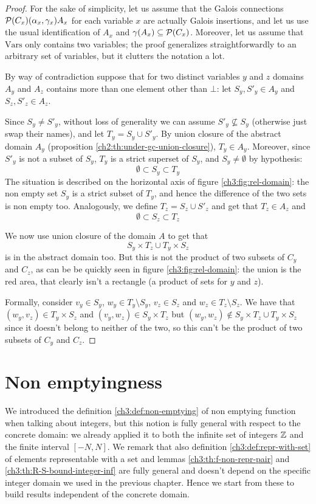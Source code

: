 \begin{proof}
	For the sake of simplicity, let us assume that the Galois connections $\mathcal{P}(C_x) (\alpha_x, \gamma_x) A_x$ for each variable $x$ are actually Galois insertions, and let us use the usual identification of $A_x$ and $\gamma(A_x) \subseteq \mathcal{P}(C_x)$.
	Moreover, let us assume that $\text{Vars}$ only contains two variables; the proof generalizes straightforwardly to an arbitrary set of variables, but it clutters the notation a lot.

	By way of contradiction suppose that for two distinct variables $y$ and $z$ domains $A_y$ and $A_z$ contains more than one element other than $\bot$: let $S_y, S'_y \in A_y$ and $S_z, S'_z \in A_z$.

	Since $S_y \neq S'_y$, without loss of generality we can assume $S'_y \nsubseteq S_y$ (otherwise just swap their names), and let $T_y = S_y \cup S'_y$. By union closure of the abstract domain $A_y$ (proposition \ref{ch2:th:under-gc-union-closure}), $T_y \in A_y$. Moreover, since $S'_y$ is not a subset of $S_y$, $T_y$ is a strict superset of $S_y$, and $S_y \neq \emptyset$ by hypothesis:
	\[
	\emptyset \subset S_y \subset T_y
	\]
	The situation is described on the horizontal axis of figure \ref{ch3:fig:rel-domain}: the non empty set $S_y$ is a strict subset of $T_y$, and hence the difference of the two sets is non empty too.
	Analogously, we define $T_z = S_z \cup S'_z$ and get that $T_z \in A_z$ and
	\[
	\emptyset \subset S_z \subset T_z
	\]

	We now use union closure of the domain $A$ to get that
	\[
	S_y \times T_z \cup T_y \times S_z
	\]
	is in the abstract domain too. But this is not the product of two subsets of $C_y$ and $C_z$, as can be be quickly seen in figure \ref{ch3:fig:rel-domain}: the union is the red area, that clearly isn't a rectangle (a product of sets for $y$ and $z$).
	
	Formally, consider $v_y \in S_y$, $w_y \in T_y \setminus S_y$, $v_z \in S_z$ and $w_z \in T_z \setminus S_z$. We have that $(w_y, v_z) \in T_y \times S_z$ and $(v_y, w_z) \in S_y \times T_z$ but $(w_y, w_z) \notin S_y \times T_z \cup T_y \times S_z$ since it doesn't belong to neither of the two, so this can't be the product of two subsets of $C_y$ and $C_z$.
\end{proof}

\section{Non emptyingness}
We introduced the definition \ref{ch3:def:non-emptying} of non emptying function when talking about integers, but this notion is fully general with respect to the concrete domain: we already applied it to both the infinite set of integers $\mathbb{Z}$ and the finite interval $[-N, N]$.
We remark that also definition \ref{ch3:def:repr-with-set} of elements representable with a set and lemmas \ref{ch3:th:f-non-repr-pair} and \ref{ch3:th:R-S-bound-integer-inf} are fully general and doesn't depend on the specific integer domain we used in the previous chapter. Hence we start from these to build results independent of the concrete domain.


